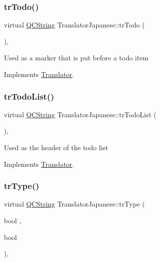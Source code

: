 \subsubsection{\texorpdfstring{trTodo()}{trTodo()}}
{\footnotesize\ttfamily virtual \mbox{\hyperlink{class_q_c_string}{Q\+C\+String}} Translator\+Japanese\+::tr\+Todo (\begin{DoxyParamCaption}{ }\end{DoxyParamCaption})\hspace{0.3cm}{\ttfamily [inline]}, {\ttfamily [virtual]}}

Used as a marker that is put before a todo item 

Implements \mbox{\hyperlink{class_translator}{Translator}}.

\mbox{\label{class_translator_japanese_a34ec4a876b0ba587cf001c0a7133874f}} 
\subsubsection{\texorpdfstring{trTodoList()}{trTodoList()}}
{\footnotesize\ttfamily virtual \mbox{\hyperlink{class_q_c_string}{Q\+C\+String}} Translator\+Japanese\+::tr\+Todo\+List (\begin{DoxyParamCaption}{ }\end{DoxyParamCaption})\hspace{0.3cm}{\ttfamily [inline]}, {\ttfamily [virtual]}}

Used as the header of the todo list 

Implements \mbox{\hyperlink{class_translator}{Translator}}.

\mbox{\label{class_translator_japanese_afe53027b537d75f15b36d972ef1c83f4}} 
\subsubsection{\texorpdfstring{trType()}{trType()}}
{\footnotesize\ttfamily virtual \mbox{\hyperlink{class_q_c_string}{Q\+C\+String}} Translator\+Japanese\+::tr\+Type (\begin{DoxyParamCaption}\item[{bool}]{,  }\item[{bool}]{ }\end{DoxyParamCaption})\hspace{0.3cm}{\ttfamily [inline]}, {\ttfamily [virtual]}}

